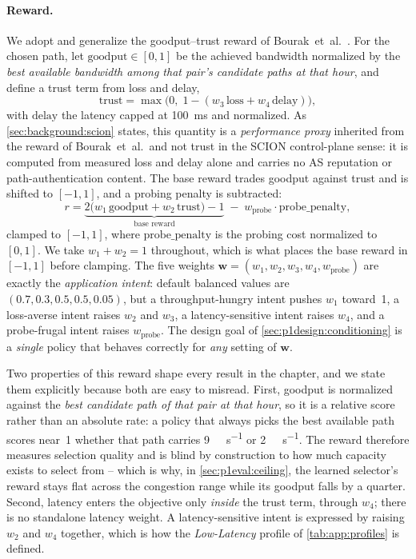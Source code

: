 \paragraph{Reward.} We adopt and generalize the goodput--trust reward of
Bourak~et~al.~\cite{Bourak2025}. For the chosen path, let $\mathrm{goodput}\in[0,1]$ be the achieved
bandwidth normalized by the \emph{best available bandwidth among that pair's candidate paths at that
hour}, and define a trust term from loss and delay,
\begin{equation}
\mathrm{trust} = \max\!\big(0,\; 1 - (w_3\,\mathrm{loss} + w_4\,\mathrm{delay})\big),
\label{eq:p1trust}
\end{equation}
with $\mathrm{delay}$ the latency capped at \SI{100}{\milli\second} and normalized. As
\cref{sec:background:scion} states, this quantity is a \emph{performance proxy} inherited from the
reward of Bourak~et~al.\ and not trust in the SCION control-plane sense: it is computed from measured
loss and delay alone and carries no AS reputation or path-authentication content. The base reward
trades goodput against trust and is shifted to $[-1,1]$, and a probing penalty is subtracted:
\begin{equation}
r = \underbrace{2\big(w_1\,\mathrm{goodput} + w_2\,\mathrm{trust}\big) - 1}_{\text{base reward}}
    \;-\; w_{\text{probe}}\cdot \mathrm{probe\_penalty},
\label{eq:p1reward}
\end{equation}
clamped to $[-1,1]$, where $\mathrm{probe\_penalty}$ is the probing cost normalized to $[0,1]$. We take
$w_1 + w_2 = 1$ throughout, which is what places the base reward in $[-1,1]$ before clamping. The
five weights $\mathbf{w} = (w_1, w_2, w_3, w_4, w_{\text{probe}})$ are exactly the \emph{application
intent}: default balanced values are $(0.7, 0.3, 0.5, 0.5, 0.05)$, but a throughput-hungry intent
pushes $w_1$ toward~1, a loss-averse intent raises $w_2$ and $w_3$, a latency-sensitive intent raises
$w_4$, and a probe-frugal intent raises $w_{\text{probe}}$. The design goal of
\cref{sec:p1design:conditioning} is a \emph{single} policy that behaves correctly for \emph{any} setting
of $\mathbf{w}$.

Two properties of this reward shape every result in the chapter, and we state them explicitly because
both are easy to misread. First, goodput is normalized against the \emph{best candidate path of that
pair at that hour}, so it is a relative score rather than an absolute rate: a policy that always picks
the best available path scores near~1 whether that path carries \SI{9}{\giga\bit\per\second} or
\SI{2}{\giga\bit\per\second}. The reward therefore measures selection quality and is blind by
construction to how much capacity exists to select from -- which is why, in \cref{sec:p1eval:ceiling},
the learned selector's reward stays flat across the congestion range while its goodput falls by a
quarter. Second, latency enters the objective only \emph{inside} the trust term, through $w_4$; there is
no standalone latency weight. A latency-sensitive intent is expressed by raising $w_2$ and $w_4$
together, which is how the \emph{Low-Latency} profile of \cref{tab:app:profiles} is defined.


